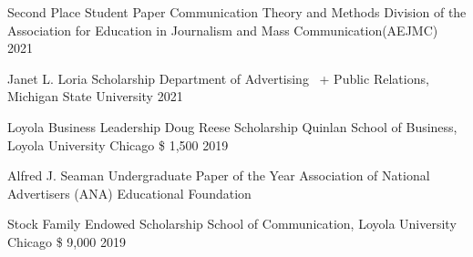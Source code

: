 
\begin{cvhonors}

    \cvhonor
    {Second Place Student Paper} %
    {Communication Theory and Methods Division of the Association for Education in Journalism and Mass Communication(AEJMC) } %
    {} %
    {2021} %
    
  \cvhonor
    {Janet L. Loria Scholarship} %
    {Department of Advertising \ +  Public Relations, Michigan State University} %
    {} %
    {2021} %
\end{cvhonors}

\begin{cvhonors}

  \cvhonor
    {Loyola Business Leadership Doug Reese Scholarship} %
   {Quinlan School of Business, Loyola University Chicago
} %
    {\$ 1,500} %
    {2019} %

\cvhonor
    {Alfred J. Seaman Undergraduate Paper of the Year} %
    {Association of National Advertisers (ANA) Educational Foundation
} %
    {} %
    {} %
\end{cvhonors}

\begin{cvhonors}

  \cvhonor
    {Stock Family Endowed Scholarship} %
    {School of Communication, Loyola University Chicago} %
    {\$ 9,000} %
    {2019} %
\end{cvhonors}


